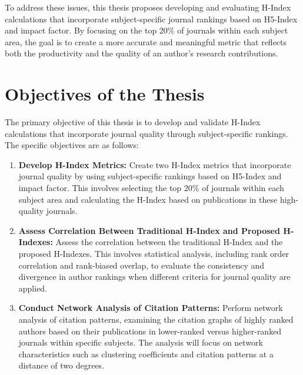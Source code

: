 To address these issues, this thesis proposes developing and evaluating H-Index
calculations that incorporate subject-specific journal rankings based on
H5-Index and impact factor. By focusing on the top 20\% of journals within each
subject area, the goal is to create a more accurate and meaningful metric that
reflects both the productivity and the quality of an author's research
contributions.

\section{Objectives of the Thesis}
The primary objective of this thesis is to develop and validate H-Index
calculations that incorporate journal quality through subject-specific
rankings. The specific objectives are as follows:
\begin{enumerate}
      \item \textbf{Develop H-Index Metrics:} Create two H-Index metrics that incorporate journal quality
            by using subject-specific rankings based on H5-Index and impact factor.
            This involves selecting the top 20\% of journals within each subject area and calculating the H-Index based on publications
            in these high-quality journals.
      \item \textbf{Assess Correlation Between Traditional H-Index and Proposed H-Indexes:} Assess the correlation between the traditional H-Index
            and the proposed H-Indexes. This involves statistical analysis, including rank order correlation
            and rank-biased overlap, to evaluate the consistency and divergence in author rankings when different criteria for journal quality are applied.
      \item \textbf{Conduct Network Analysis of Citation Patterns:} Perform network analysis of citation patterns,
            examining the citation graphs of highly ranked authors based on their publications in lower-ranked versus
            higher-ranked journals within specific subjects. The analysis will focus on network characteristics such as
            clustering coefficients and citation patterns at a distance of two degrees.

\end{enumerate}

